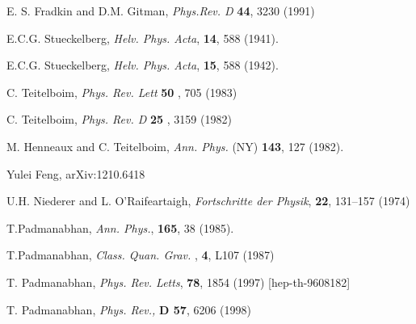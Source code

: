 \documentclass[12pt]{article}
\begin{document}
\begin{thebibliography}{000}
  E. S. Fradkin and D.M. Gitman,  \textit{Phys.Rev. D} \textbf{44},  3230 (1991)
  
  E.C.G. Stueckelberg, \textit{ Helv. Phys. Acta}, \textbf{14}, 588 (1941).
 
  E.C.G. Stueckelberg, \textit{ Helv. Phys. Acta}, \textbf{15}, 588 (1942).

   C. Teitelboim, \textit{Phys. Rev. Lett} \textbf{50} , 705 (1983)
 
   C. Teitelboim, \textit{Phys. Rev. D} \textbf{25} , 3159 (1982)
 
   M. Henneaux and C. Teitelboim, \textit{Ann. Phys.} (NY) \textbf{143}, 127 (1982). 

  Yulei Feng, arXiv:1210.6418
  
 U.H. Niederer and L. O’Raifeartaigh,  \textit{Fortschritte der Physik}, \textbf{22}, 131–157 (1974)

  
T.Padmanabhan,  \textit{Ann. Phys.},  \textbf{165}, 38 (1985). 


T.Padmanabhan, \textit{Class. Quan. Grav. }, \textbf{4}, L107 (1987)


T. Padmanabhan, \textit{Phys. Rev. Letts}, \textbf{78}, 1854 (1997) [hep-th-9608182] 


T. Padmanabhan, \textit{ Phys. Rev.,} \textbf{D 57}, 6206 (1998) 

\end{thebibliography}
\end{document}
